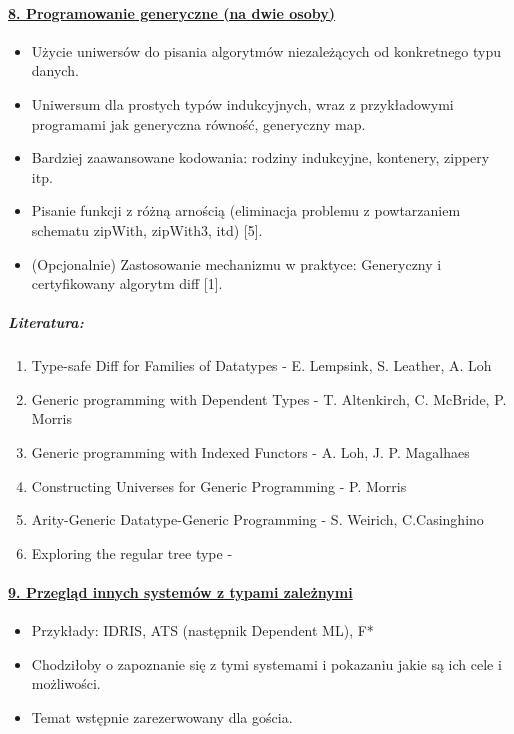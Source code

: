 \documentclass[10pt, a4paper]{article}
\begin{document}
\paragraph{\underline{8. Programowanie generyczne (na dwie osoby)}}

\begin{itemize}
\addtolength{\itemsep}{-0.5\baselineskip}

\item Użycie uniwersów do pisania algorytmów niezależących od konkretnego typu danych.
\item Uniwersum dla prostych typów indukcyjnych, wraz z przykładowymi programami jak generyczna równość, generyczny map.
\item Bardziej zaawansowane kodowania: rodziny indukcyjne, kontenery, zippery itp.
\item Pisanie funkcji z różną arnością (eliminacja problemu z powtarzaniem schematu zipWith, zipWith3, itd) [5].
\item (Opcjonalnie) Zastosowanie mechanizmu w praktyce: Generyczny i certyfikowany algorytm diff [1].

\end{itemize}

\subparagraph{Literatura:}


\begin{enumerate}
\addtolength{\itemsep}{-0.5\baselineskip}

\item  Type-safe Diff for Families of Datatypes - E. Lempsink, S. Leather, A. Loh
\item  Generic programming with Dependent Types - T. Altenkirch, C. McBride, P. Morris
\item  Generic programming with Indexed Functors - A. Loh, J. P. Magalhaes
\item  Constructing Universes for Generic Programming - P. Morris
\item  Arity-Generic Datatype-Generic Programming - S. Weirich, C.Casinghino
\item  Exploring the regular tree type -

\end{enumerate}

\paragraph{\underline{9. Przegląd innych systemów z typami zależnymi}}

\begin{itemize}
\addtolength{\itemsep}{-0.5\baselineskip}
 \item Przykłady: IDRIS, ATS (następnik Dependent ML), F*
 \item Chodziłoby o zapoznanie się z tymi systemami i pokazaniu jakie są ich cele i możliwości.
 \item Temat wstępnie zarezerwowany dla gościa.
\end{itemize}
\end{document}
